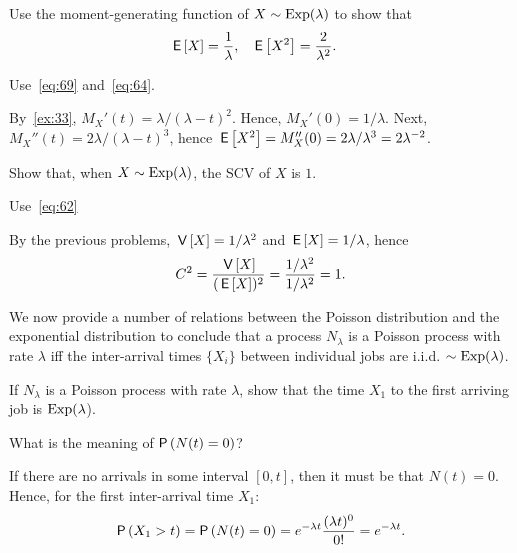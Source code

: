 \documentclass[companion]{subfiles}
\begin{document}
\begin{exercise}
Use the moment-generating function of $X\sim\operatorname{Exp}(\lambda)$ to show that
 \begin{align*}
 \,\mathsf{E}\left[X\right] &=\frac1\lambda, & 
 \,\mathsf{E}\left[X^2\right] &=\frac2{\lambda^2}.
 \end{align*}
\begin{hint}
Use~\cref{eq:69} and~\cref{eq:64}.
\end{hint}
\begin{solution} By~\cref{ex:33}, 
 $ M_X'(t)=\lambda/(\lambda-t)^2$. Hence, $M_X'(0)=1/\lambda$. Next, $M_X''(t)=2\lambda/(\lambda-t)^3$, hence $\,\mathsf{E}\left[X^2\right]=M_X''(0)=2\lambda/\lambda^3=2\lambda^{-2}$. 
\end{solution}
\end{exercise}

\begin{extra}
Show that, when $X\sim\operatorname{Exp}(\lambda)$,  the SCV of $X$  is $1$.
\begin{hint}
 Use~\cref{eq:62} 
\end{hint}
\begin{solution}
 By the previous problems, $\,\mathsf{V}\left[X\right] = 1/\lambda^2$ and $\,\mathsf{E}\left[X\right]=1/\lambda$, hence
 \begin{equation*}
 C^2= \frac{\,\mathsf{V}\left[X\right]}{(\,\mathsf{E}\left[X\right])^2} = \frac{1/\lambda^2}{1/\lambda^2} = 1.
 \end{equation*}
\end{solution}
\end{extra}

We now provide a number of relations between the Poisson distribution and the exponential distribution to conclude that a process $N_\lambda$ is a Poisson process with rate $\lambda$ iff the inter-arrival times $\{X_i\}$ between individual jobs are i.i.d. $\sim\operatorname{Exp}(\lambda)$. 


\begin{exercise}
 If $N_\lambda$ is a Poisson process with rate $\lambda$, show that the time $X_1$ to the first arriving job is $\operatorname{Exp}(\lambda$).
\begin{hint}
 What is the meaning of $\P{N(t)=0}$?
\end{hint}
\begin{solution}
If there are no arrivals in some interval $[0,t]$, then it
must be that $N(t) = 0$. Hence, for the first inter-arrival time $X_1$: 
\begin{equation*}
 \P{X_1> t} = \P{N(t) = 0} = e^{-\lambda t} \frac{(\lambda t)^0}{0!}= e^{-\lambda t}.
\end{equation*}
\end{solution}
\end{exercise}
\end{document}
